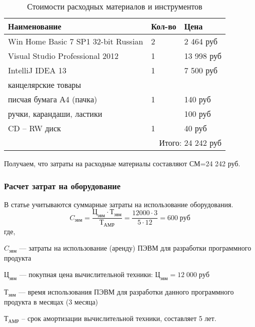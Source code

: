 \renewcommand{\arraystretch}{1.4} %
\begin{table}[!htb]
	\caption{Стоимости расходных материалов и инструментов}\label{tab:a}
    \centering
        \begin{tabular}{|l|l|l|}
        		\hline
        		Наименование & Кол-во & Цена \\
        		\hline
        		Win Home Basic 7 SP1 32-bit Russian & 2 & 2 464 руб \\
        		\hline
        		Visual Studio Professional 2012 & 1 & 13 998 руб\\
        		\hline
        		IntelliJ IDEA 13 & 1 & 7 500 руб\\ 
        		\hline
        		\multicolumn{3}{|l|}{канцелярские товары}\\
        		\hline
        		писчая бумага А4 (пачка) & 1 & 140 руб\\
        		\hline
        		ручки, карандаши, ластики &   & 100 руб\\
        		\hline
        		CD – RW диск & 1 & 40 руб\\
        		\hline
        		\multicolumn{3}{|r|}{Итого: 24 242 руб }\\
        		\hline
        \end{tabular}
    		
\end{table}

Получаем, что  затраты на расходные материалы составляют 
СМ=24 242 руб.


\subsubsection{Расчет затрат на оборудование}

В статье учитываются суммарные затраты на использование оборудования.
$$ 
C_{эвм}=
\frac{Ц_{эвм} \cdot Т_{эвм}}{Т_{АМР}} =
\frac{12 000 \cdot 3}{5 \cdot 12} = 
600 \; руб
$$
где, 

$C_{эвм}$ — затраты на использование (аренду) ПЭВМ для разработки программного продукта

$Ц_{эвм}$ — покупная цена вычислительной техники: $Ц_{эвм} = 12 \; 000 \; руб$

$Т_{эвм}$ — время использования ПЭВМ для разработки данного программного продукта в месяцах (3 месяца)

$Т_{АМР}$ – срок амортизации вычислительной техники, составляет 5 лет. 

